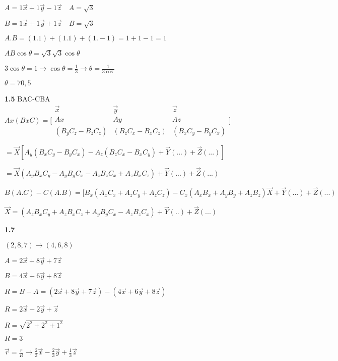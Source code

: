 \documentclass{article}
\begin{document}
$A= 1\vec x + 1\vec y - 1 \vec z \quad A=\sqrt{3}$ 

$B= 1\vec x + 1\vec y + 1 \vec z \quad B=\sqrt{3}$ \newline

$A.B= (1.1)+(1.1)+(1.-1) = 1+1-1 =1$

$AB\cos \theta = \sqrt{3}\sqrt{3}\cos\theta$

$3\cos{\theta}=1 \rightarrow \cos{\theta}=\frac{1}{3}\rightarrow \theta=\frac{1}{3\cos}$

$\theta = 70,5$\newline\newline

\textbf{1.5}\newline
BAC-CBA \newline
$Ax(BxC)=\Bigg[ \begin{array}{ccc}
     \vec x & \vec y & \vec z \\
     Ax & Ay & Az \\
     (B_yC_z - B_zC_z)&(B_zC_x - B_xC_z)&(B_xC_y - B_yC_x) 
\end{array}{}\Bigg]$\newline

$= \vec X[A_y(B_xC_y - B_yC_x)-A_z(B_zC_x - B_xC_y)+\vec Y(...)+\vec Z(...) ] $

$= \vec X(A_yB_xC_y - A_yB_yC_x - A_zB_zC_x + A_zB_xC_z) + \vec Y(...) +\vec Z(...)$\newline

$B(A.C)- C(A.B) = [B_x(A_xC_x+A_zC_y+A_zC_z)- C_x(A_xB_x+A_yB_y+A_zB_z)\vec X +\vec Y(...) + \vec Z(...)$

$\vec X= (A_zB_xC_y+A_zB_xC_z+A_yB_yC_x-A_zB_zC_x)+\vec Y(..) + \vec Z (...)$\newline\newline

\textbf{1.7}

$(2,8,7) \rightarrow (4,6,8)$

$A = 2 \vec x + 8\vec y +7\vec z$

$B = 4\vec x + 6\vec y + 8\vec z$\newline

$R = B-A = (2 \vec x + 8\vec y +7\vec z)-(4\vec x + 6\vec y + 8\vec z) $

$R = 2\vec x - 2\vec y + \vec z$

$R=\sqrt{2^2+2^2+1^2}$

$R=3$

$\vec r = \frac{r}{R} \rightarrow \frac{2}{3}\vec x -\frac{2}{3}\vec y +\frac{1}{3}\vec z$ \newline\newline
\end{document}
